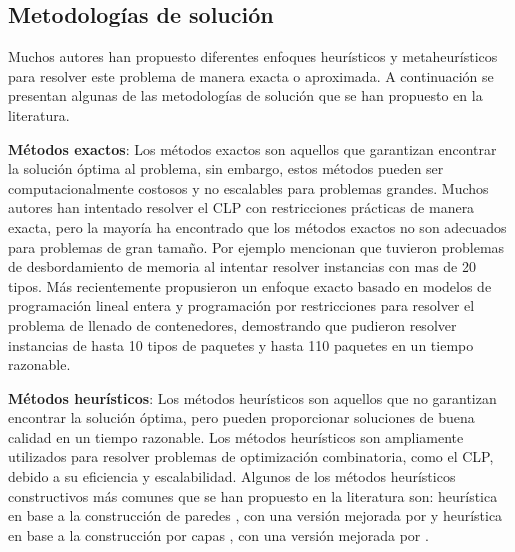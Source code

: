 \documentclass[openany]{article}
\begin{document}
\subsection{Metodologías de solución}

Muchos autores han propuesto diferentes enfoques heurísticos y metaheurísticos para resolver este problema de manera exacta o aproximada. A continuación se presentan algunas de las metodologías de solución que se han propuesto en la literatura.

\textbf{Métodos exactos}: Los métodos exactos son aquellos que garantizan encontrar la solución óptima al problema, sin embargo, estos métodos pueden ser computacionalmente costosos y no escalables para problemas grandes. Muchos autores han intentado resolver el CLP con restricciones prácticas de manera exacta, pero la mayoría ha encontrado que los métodos exactos no son adecuados para problemas de gran tamaño. Por ejemplo \textcite{JUNQUEIRA201274} mencionan que tuvieron problemas de desbordamiento de memoria al intentar resolver instancias con mas de 20 tipos. Más recientemente \textcite{NASCIMENTO2021105186} propusieron un enfoque exacto basado en modelos de programación lineal entera y programación por restricciones para resolver el problema de llenado de contenedores, demostrando que pudieron resolver instancias de hasta 10 tipos de paquetes y hasta 110 paquetes en un tiempo razonable.

\textbf{Métodos heurísticos}: Los métodos heurísticos son aquellos que no garantizan encontrar la solución óptima, pero pueden proporcionar soluciones de buena calidad en un tiempo razonable. Los métodos heurísticos son ampliamente utilizados para resolver problemas de optimización combinatoria, como el CLP, debido a su eficiencia y escalabilidad. Algunos de los métodos heurísticos constructivos más comunes que se han propuesto en la literatura son: heurística en base a la construcción de paredes \parencite{GEORGE1980147}, con una versión mejorada por \textcite{PISINGER2002382} y heurística en base a la construcción por capas \parencite{BISCHOFF1995377}, con una versión mejorada por \textcite{RANCKJUNIOR2019471}.
\end{document}
